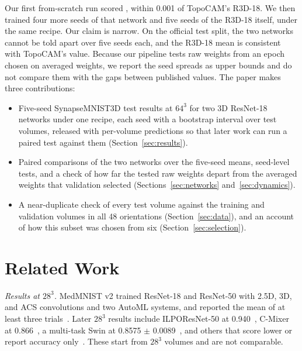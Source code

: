 \documentclass[conference]{IEEEtran}
\newif\ifanycitation
\let\citeAnyKey\cite
\renewcommand{\cite}{\global\anycitationtrue\citeAnyKey}
\begin{document}
Our first from-scratch run scored \AurocScratchZero{}, within 0.001 of TopoCAM's R3D-18. We
then trained four more seeds of that network and five seeds of the R3D-18 itself, under the
same recipe. Our claim is narrow. On the official test split, the two networks cannot be
told apart over five seeds each, and the R3D-18 mean is consistent with TopoCAM's value.
Because our pipeline tests raw weights from an epoch chosen on averaged weights, we report
the seed spreads as upper bounds and do not compare them with the gaps between published
values.
The paper makes three contributions:
\begin{itemize}
\item Five-seed SynapseMNIST3D test results at $64^3$ for two 3D ResNet-18 networks under
one recipe, each seed with a bootstrap interval over test volumes, released with per-volume
predictions so that later work can run a paired test against them (Section~\ref{sec:results}).
\item Paired comparisons of the two networks over the five-seed means, seed-level tests,
and a check of how far the tested raw weights depart from the averaged weights that
validation selected
(Sections~\ref{sec:networks} and~\ref{sec:dynamics}).
\item A near-duplicate check of every test volume against the training and validation
volumes in all 48 orientations (Section~\ref{sec:data}), and an account of how this subset
was chosen from six (Section~\ref{sec:selection}).
\end{itemize}

\section{Related Work}

\emph{Results at $28^3$.} MedMNIST v2 trained ResNet-18 and ResNet-50 with 2.5D, 3D, and
ACS convolutions and two AutoML systems, and reported the mean of at least three
trials~\cite{yang2023medmnist}. Later $28^3$ results include ILPOResNet-50 at
0.940~\cite{zhemchuzhnikov2024ilponet}, C-Mixer at 0.866~\cite{zheng2023complex}, a
multi-task Swin at 0.8575 $\pm$ 0.0089~\cite{schafer2024umedpt}, and others that score
lower or report accuracy only~\cite{ziller2023interpretable,li2025tropical,kuipers2023regular,lyra2026fisher}.
These start from $28^3$ volumes and are not comparable.
\end{document}
